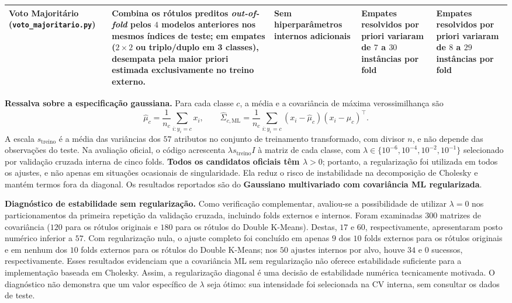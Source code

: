 \documentclass[a4paper,11pt]{article}
\begin{document}
\begin{center}
\begin{minipage}{\linewidth}
\begin{tabularx}{\linewidth}{P{2.25cm} L P{2.85cm} P{2.3cm} P{2.3cm}}
\textbf{Voto Majoritário} (\texttt{voto\_\allowbreak majoritario.py}) & Combina os rótulos preditos \textit{out-of-fold} pelos $4$ modelos anteriores nos mesmos índices de teste; em empates ($2 \times 2$ ou triplo/duplo em 3 classes), desempata pela maior priori estimada exclusivamente no treino externo. & Sem hiperparâmetros internos adicionais & Empates resolvidos por priori variaram de $7$ a $30$ instâncias por fold & Empates resolvidos por priori variaram de $8$ a $29$ instâncias por fold \\
\bottomrule
\end{tabularx}
\end{minipage}
\end{center}



\noindent\textbf{Ressalva sobre a especificação gaussiana.} Para cada classe $c$, a média e a covariância de máxima verossimilhança são
\[
\hat\mu_c=\frac{1}{n_c}\sum_{i:y_i=c}x_i,
\qquad
\hat\Sigma_{c,\mathrm{ML}}=\frac{1}{n_c}\sum_{i:y_i=c}(x_i-\hat\mu_c)(x_i-\hat\mu_c)^{\top}.
\]
A escala $s_{\text{treino}}$ é a média das variâncias dos $57$ atributos no conjunto de treinamento transformado, com divisor $n$, e não depende das observações do teste. Na avaliação oficial, o código acrescenta $\lambda s_{\text{treino}}I$ à matriz de cada classe, com $\lambda\in\{10^{-6},10^{-4},10^{-2},10^{-1}\}$ selecionado por validação cruzada interna de cinco folds. \textbf{Todos os candidatos oficiais têm $\lambda>0$}; portanto, a regularização foi utilizada em todos os ajustes, e não apenas em situações ocasionais de singularidade. Ela reduz o risco de instabilidade na decomposição de Cholesky e mantém termos fora da diagonal. Os resultados reportados são do \textbf{Gaussiano multivariado com covariância ML regularizada}.\par\noindent\textbf{Diagnóstico de estabilidade sem regularização.} Como verificação complementar, avaliou-se a possibilidade de utilizar $\lambda=0$ nos particionamentos da primeira repetição da validação cruzada, incluindo folds externos e internos. Foram examinadas $300$ matrizes de covariância ($120$ para os rótulos originais e $180$ para os rótulos do Double K-Means). Destas, $17$ e $60$, respectivamente, apresentaram posto numérico inferior a $57$. Com regularização nula, o ajuste completo foi concluído em apenas $9$ dos $10$ folds externos para os rótulos originais e em nenhum dos $10$ folds externos para os rótulos do Double K-Means; nos $50$ ajustes internos por alvo, houve $34$ e $0$ sucessos, respectivamente. Esses resultados evidenciam que a covariância ML sem regularização não oferece estabilidade suficiente para a implementação baseada em Cholesky. Assim, a regularização diagonal é uma decisão de estabilidade numérica tecnicamente motivada. O diagnóstico não demonstra que um valor específico de $\lambda$ seja ótimo: sua intensidade foi selecionada na CV interna, sem consultar os dados de teste.
\end{document}
